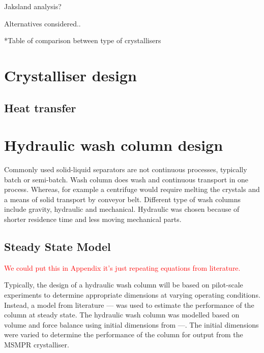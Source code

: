 Jaksland analysis?

Alternatives considered..

*Table of comparison between type of crystallisers

 




\section{Crystalliser design}




\subsection{Heat transfer}





























\section{Hydraulic wash column design}

Commonly used solid-liquid separators are not continuous processes, typically batch or semi-batch. Wash column does wash and continuous transport in one process. Whereas, for example a centrifuge would require  melting the crystals and a means of solid transport by conveyor belt. Different type of wash columns include gravity, hydraulic and mechanical. Hydraulic was chosen because of shorter residence time and less moving mechanical parts. 

\subsection{Steady State Model}  \textcolor{red}{We could put this in Appendix it's just repeating equations from literature.} 

Typically, the design of a hydraulic wash column will be based on pilot-scale experiments to determine appropriate dimensions at varying operating conditions. Instead, a  model from literature --- was used to estimate the performance of the column at steady state. The hydraulic wash column was modelled based on volume and force balance using initial dimensions from ---. The initial dimensions were varied to determine the performance of the column for output from the MSMPR crystalliser. 

